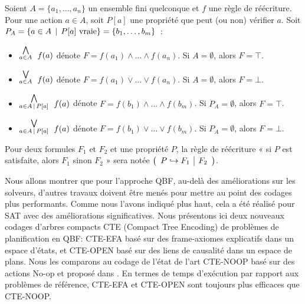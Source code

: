 {\color{red}

Soient $A=\{a_1, \ldots, a_n\}$ un ensemble fini quelconque et $f$ une règle de
réécriture.  Pour une action $a\in A$, soit $P[a]$ une propriété que peut (ou
non) vérifier $a$. Soit $P_A=\{a\in A \,\mid\, P[a]\
\mathrm{vraie}\}=\{b_1,\ldots,b_m\}$~:
\begin{itemize}
\item $\stackrel{\bigwedge}{_{a\in A}}~ f(a)$ dénote $F=f(a_1) \land\ldots\land f(a_n)$. Si $A=\emptyset$, alors $F=\top$.
\item $\stackrel{\bigvee}{_{a\in A}}~ f(a)$ dénote $F=f(a_1) \lor\ldots\lor f(a_n)$. Si $A=\emptyset$, alors $F=\bot$.
\item $\stackrel{\bigwedge}{_{a\in A \,\mid\, P[a]}}~ f(a)$ dénote $F=f(b_1) \land\ldots\land f(b_m)$. Si $P_A=\emptyset$, alors $F=\top$.
\item $\stackrel{\bigvee}{_{a\in A \,\mid\, P[a]}}~ f(a)$ dénote $F=f(b_1) \lor\ldots\lor f(b_m)$. Si $P_A=\emptyset$, alors $F=\bot$.
\end{itemize}

Pour deux formules $F_1$ et $F_2$ et une propriété $P$, la règle de réécriture
« si $P$ est satisfaite, alors $F_1$ sinon $F_2$ » sera notée
$\left(\begin{array}{l|l}{P}\hookrightarrow{F_1} & {F_2}\end{array}\right)$.
}



Nous allons montrer que pour l'approche QBF, au-delà des améliorations sur les solveurs, d'autres travaux doivent être menés pour mettre au point des codages plus performants. Comme nous l'avons indiqué plus haut, cela a été réalisé pour SAT avec des améliorations significatives. Nous présentons ici deux nouveaux codages d'arbres compacts CTE (Compact Tree Encoding) de problèmes de planification en QBF: CTE-EFA basé sur des frame-axiomes explicatifs dans un espace d'états, et CTE-OPEN basé sur des liens de causalité dans un espace de plans.  Nous les comparons au codage de l'état de l'art CTE-NOOP basé sur des actions No-op et proposé dans \cite{DBLP:conf/ecai/CashmoreFG12}. En termes de temps d'exécution par rapport aux problèmes de référence, CTE-EFA et CTE-OPEN sont toujours plus efficaces que CTE-NOOP.


